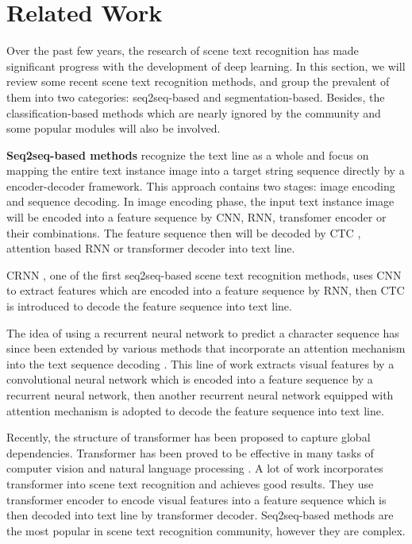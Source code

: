 \documentclass[final]{cvpr}
\begin{document}
\section{Related Work}
Over  the past few years, the research of scene text recognition has made significant progress with the development of deep learning. In this section, we will review some recent scene text recognition methods, and group the prevalent of them into two categories: seq2seq-based and segmentation-based. Besides, the classification-based methods which are nearly ignored by the community and some popular modules will also be involved.

\textbf{Seq2seq-based methods} recognize the text line as a whole and focus on mapping the entire text instance image into a target string sequence directly by a encoder-decoder framework. This approach contains two stages: image encoding and sequence decoding. In image encoding phase, the input text instance image will be encoded into a feature sequence by CNN, RNN, transfomer \cite{vaswani2017attention} encoder or their combinations. The feature sequence then will be decoded by CTC \cite{graves2006connectionist}, attention \cite{bahdanau2014neural} based RNN or transformer \cite{vaswani2017attention} decoder into text line. 

CRNN \cite{shi2016end}, one of the first seq2seq-based scene text recognition methods, uses CNN to extract features which are encoded into a feature sequence by RNN, then CTC  \cite{graves2006connectionist} is introduced to decode the feature sequence into text line.

The idea of using a recurrent neural network to predict
a character sequence has since been extended by various
methods that incorporate an attention mechanism \cite{bahdanau2014neural, chorowski2015attention} into the
text sequence decoding \cite{shi2016robust, shi2018aster, li2019show, zhan2019esir}. This line of work extracts visual features by a convolutional neural network which is encoded into a feature sequence by a recurrent neural network, then another recurrent neural network equipped with attention mechanism is adopted to decode the feature sequence into text line. 

Recently, the structure of transformer \cite{lin2017structured} has been proposed to capture global dependencies. Transformer has been proved to be effective in many tasks of computer vision \cite{wang2018non, carion2020end} and natural language processing \cite{vaswani2017attention, devlin2018bert, brown2020language}. A lot of work \cite{sheng2019nrtr, yang2019simple, lu2019master, lee2020recognizing, bartz2019kiss, yu2020towards} incorporates transformer into scene text recognition and achieves good results. They use transformer encoder to encode visual features into a feature sequence which is then decoded into text line by transformer decoder. 
Seq2seq-based methods are the most popular in scene text recognition community, however they are complex.
\end{document}
